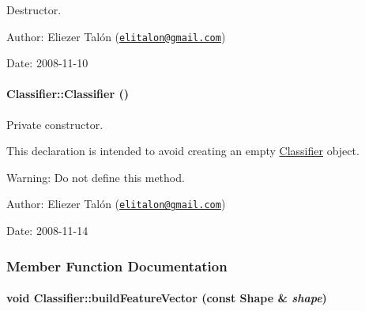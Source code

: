 Destructor. 

\begin{Desc}
\item[Author:]Eliezer Talón (\href{mailto:elitalon@gmail.com}{\tt elitalon@gmail.com}) \end{Desc}
\begin{Desc}
\item[Date:]2008-11-10 \end{Desc}
\hypertarget{class_classifier_e6132b100c96a4f3d8ad3885b5acb28e}{
\paragraph[{Classifier}]{\setlength{\rightskip}{0pt plus 5cm}Classifier::Classifier ()}\hfill}
\label{class_classifier_e6132b100c96a4f3d8ad3885b5acb28e}


Private constructor. 

This declaration is intended to avoid creating an empty \hyperlink{class_classifier}{Classifier} object.

\begin{Desc}
\item[Warning:]Do not define this method.\end{Desc}
\begin{Desc}
\item[Author:]Eliezer Talón (\href{mailto:elitalon@gmail.com}{\tt elitalon@gmail.com}) \end{Desc}
\begin{Desc}
\item[Date:]2008-11-14 \end{Desc}


\subsubsection{Member Function Documentation}
\hypertarget{class_classifier_6c5a7ef6298b0f0d84873297f1e8c7e9}{
\paragraph[{buildFeatureVector}]{\setlength{\rightskip}{0pt plus 5cm}void Classifier::buildFeatureVector (const {\bf Shape} \& {\em shape})}\hfill}
\label{class_classifier_6c5a7ef6298b0f0d84873297f1e8c7e9}


